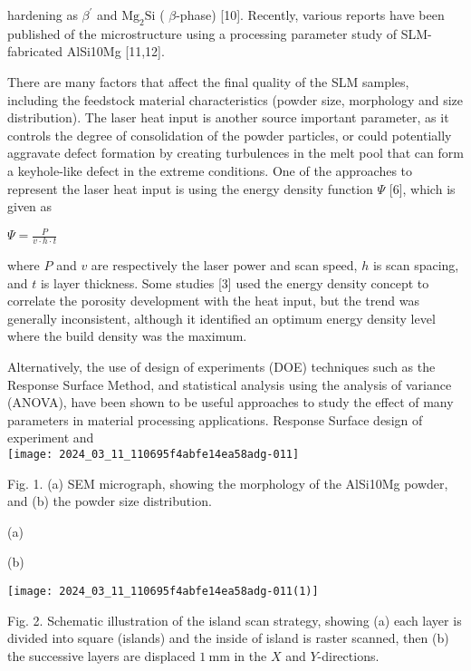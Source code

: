 \documentclass[10pt]{article}
\begin{document}
hardening as $\beta^{\prime}$ and $\mathrm{Mg}_{2} \mathrm{Si}$ ( $\beta$-phase) [10]. Recently, various reports have been published of the microstructure using a processing parameter study of SLM-fabricated AlSi10Mg [11,12].

There are many factors that affect the final quality of the SLM samples, including the feedstock material characteristics (powder size, morphology and size distribution). The laser heat input is another source important parameter, as it controls the degree of consolidation of the powder particles, or could potentially aggravate defect formation by creating turbulences in the melt pool that can form a keyhole-like defect in the extreme conditions. One of the approaches to represent the laser heat input is using the energy density function $\Psi$ [6], which is given as

$\Psi=\frac{P}{v \cdot h \cdot t}$

where $P$ and $v$ are respectively the laser power and scan speed, $h$ is scan spacing, and $t$ is layer thickness. Some studies [3] used the energy density concept to correlate the porosity development with the heat input, but the trend was generally inconsistent, although it identified an optimum energy density level where the build density was the maximum.

Alternatively, the use of design of experiments (DOE) techniques such as the Response Surface Method, and statistical analysis using the analysis of variance (ANOVA), have been shown to be useful approaches to study the effect of many parameters in material processing applications. Response Surface design of experiment and\\
\texttt{[image: 2024\_03\_11\_110695f4abfe14ea58adg-011]}

Fig. 1. (a) SEM micrograph, showing the morphology of the AlSi10Mg powder, and (b) the powder size distribution.

(a)

(b)

\begin{center}
\texttt{[image: 2024\_03\_11\_110695f4abfe14ea58adg-011(1)]}
\end{center}

Fig. 2. Schematic illustration of the island scan strategy, showing (a) each layer is divided into square (islands) and the inside of island is raster scanned, then (b) the successive layers are displaced $1 \mathrm{~mm}$ in the $X$ and $Y$-directions.
\end{document}
